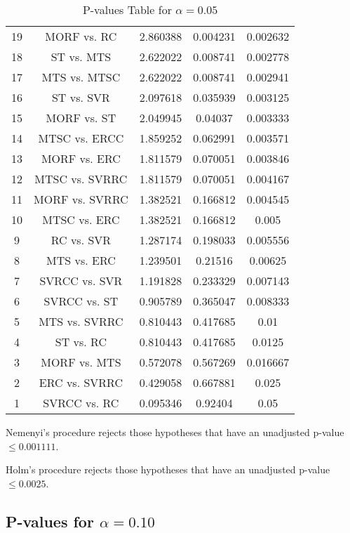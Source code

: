 \documentclass[a4paper,10pt]{article}
\begin{document}
\begin{landscape}
\begin{table}[!htp]
\begin{tabular}{ccccc}
19&MORF vs. RC&2.860388&0.004231&0.002632\\
18&ST vs. MTS&2.622022&0.008741&0.002778\\
17&MTS vs. MTSC&2.622022&0.008741&0.002941\\
16&ST vs. SVR&2.097618&0.035939&0.003125\\
15&MORF vs. ST&2.049945&0.04037&0.003333\\
14&MTSC vs. ERCC&1.859252&0.062991&0.003571\\
13&MORF vs. ERC&1.811579&0.070051&0.003846\\
12&MTSC vs. SVRRC&1.811579&0.070051&0.004167\\
11&MORF vs. SVRRC&1.382521&0.166812&0.004545\\
10&MTSC vs. ERC&1.382521&0.166812&0.005\\
9&RC vs. SVR&1.287174&0.198033&0.005556\\
8&MTS vs. ERC&1.239501&0.21516&0.00625\\
7&SVRCC vs. SVR&1.191828&0.233329&0.007143\\
6&SVRCC vs. ST&0.905789&0.365047&0.008333\\
5&MTS vs. SVRRC&0.810443&0.417685&0.01\\
4&ST vs. RC&0.810443&0.417685&0.0125\\
3&MORF vs. MTS&0.572078&0.567269&0.016667\\
2&ERC vs. SVRRC&0.429058&0.667881&0.025\\
1&SVRCC vs. RC&0.095346&0.92404&0.05\\
\hline
\end{tabular}
\caption{P-values Table for $\alpha=0.05$}
\end{table}Nemenyi's procedure rejects those hypotheses that have an unadjusted p-value $\le0.001111$.

Holm's procedure rejects those hypotheses that have an unadjusted p-value $\le0.0025$.

\pagebreak

\subsection{P-values for $\alpha=0.10$}


\end{landscape}
\end{document}
